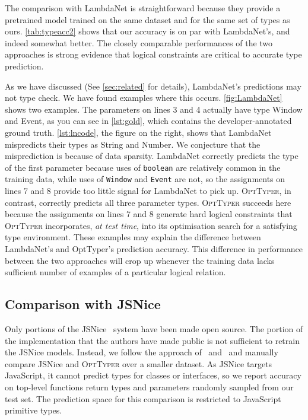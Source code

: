 \documentclass[acmsmall, review, anonymous]{acmart}\settopmatter{printfolios=true,printccs=false,printacmref=false}
\newcommand{\projectname}{\textsc{OptTyper}\xspace}
\begin{document}
The comparison with LambdaNet is straightforward because they provide a pretrained model trained on the same dataset and for the same set of types as ours. 
\cref{tab:typeacc2} shows that our accuracy is on par with LambdaNet's, and indeed somewhat better.
The closely comparable performances of the two approaches is strong evidence that logical constraints are critical to accurate type prediction. 

As we have discussed (See \autoref{sec:related} for details), 
LambdaNet's predictions may not type check.  We have found examples where this occurs. \cref{fig:LambdaNet} shows two examples.  
The parameters on lines 3 and 4 actually have type Window and Event, as you can see in \cref{lst:gold}, which contains the developer-annotated ground truth.
\cref{lst:lncode}, the figure on the right, shows that LambdaNet mispredicts their types as String and Number.
%
We conjecture that the misprediction is because of data sparsity.
%
LambdaNet correctly predicts the type of the first parameter because uses of \texttt{boolean} are relatively common in the training data, while uses of \texttt{Window} and \texttt{Event} are not, so the assignments on lines 7 and 8 provide too little signal for LambdaNet to pick up.
\projectname, in contrast, correctly predicts all three parameter types.
\projectname succeeds here because the assignments on lines 7 and 8 generate hard logical constraints that \projectname incorporates, \emph{at test time}, into its optimisation search for a satisfying type environment.
These examples may explain the difference between LambdaNet's and OptTyper's prediction accuracy. 
This difference in performance between the two approaches will crop up whenever the training data lacks sufficient number of examples of a particular logical relation.

\subsection{Comparison with JSNice}
%
Only portions of the JSNice~\cite{raychev15} system have been made open source. 
The portion of the implementation that the authors have made public is not sufficient to retrain the JSNice models. 
Instead, we follow the approach of~\citet{hellendoorn18} and~\citet{wei20} and manually compare JSNice and \projectname over a smaller dataset. 
As JSNice targets JavaScript, it cannot predict types for classes or interfaces, so we report accuracy on top-level functions return types and parameters randomly sampled from our test set. The prediction
space for this comparison is restricted to JavaScript primitive types.
\end{document}
